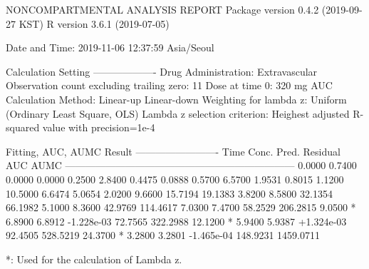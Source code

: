 \documentclass[12pt,]{krantz}
\newenvironment{Shaded}{\begin{snugshade}}{\end{snugshade}}
\newcommand{\ExtensionTok}[1]{#1}
\newcommand{\NormalTok}[1]{#1}
\begin{document}
\begin{Shaded}
\begin{Highlighting}[]
                        \ExtensionTok{NONCOMPARTMENTAL}\NormalTok{ ANALYSIS REPORT}
                       \ExtensionTok{Package}\NormalTok{ version 0.4.2 (2019-09-27 KST)}
                          \ExtensionTok{R}\NormalTok{ version 3.6.1 (2019-07-05)}

\ExtensionTok{Date}\NormalTok{ and Time: 2019-11-06 12:37:59 Asia/Seoul}

\ExtensionTok{Calculation}\NormalTok{ Setting}
\ExtensionTok{-------------------}
\ExtensionTok{Drug}\NormalTok{ Administration: Extravascular}
\ExtensionTok{Observation}\NormalTok{ count excluding trailing zero: 11}
\ExtensionTok{Dose}\NormalTok{ at time 0: 320 mg}
\ExtensionTok{AUC}\NormalTok{ Calculation Method: Linear-up Linear-down}
\ExtensionTok{Weighting}\NormalTok{ for lambda z: Uniform (Ordinary Least Square, OLS)}
\ExtensionTok{Lambda}\NormalTok{ z selection criterion: Heighest adjusted R-squared value with precision=1e-4}


\ExtensionTok{Fitting}\NormalTok{, AUC, AUMC Result}
\ExtensionTok{-------------------------}
      \ExtensionTok{Time}\NormalTok{         Conc.      Pred.   Residual       AUC       AUMC}
\ExtensionTok{---------------------------------------------------------------------}
     \ExtensionTok{0.0000}\NormalTok{       0.7400                           0.0000     0.0000}
     \ExtensionTok{0.2500}\NormalTok{       2.8400                           0.4475     0.0888}
     \ExtensionTok{0.5700}\NormalTok{       6.5700                           1.9531     0.8015}
     \ExtensionTok{1.1200}\NormalTok{      10.5000                           6.6474     5.0654}
     \ExtensionTok{2.0200}\NormalTok{       9.6600                          15.7194    19.1383}
     \ExtensionTok{3.8200}\NormalTok{       8.5800                          32.1354    66.1982}
     \ExtensionTok{5.1000}\NormalTok{       8.3600                          42.9769   114.4617}
     \ExtensionTok{7.0300}\NormalTok{       7.4700                          58.2529   206.2815}
     \ExtensionTok{9.0500}\NormalTok{ *     6.8900     6.8912 -1.228e-03    72.7565   322.2988}
    \ExtensionTok{12.1200}\NormalTok{ *     5.9400     5.9387 +1.324e-03    92.4505   528.5219}
    \ExtensionTok{24.3700}\NormalTok{ *     3.2800     3.2801 -1.465e-04   148.9231  1459.0711}

\ExtensionTok{*}\NormalTok{: Used for the calculation of Lambda z.}



\end{Highlighting}
\end{Shaded}
\end{document}
